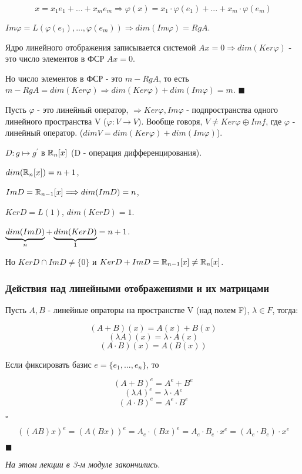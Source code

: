 \documentclass[../main.tex]{subfiles}
\begin{document}
$$x = x_1e_1 + ... + x_m e_m\Longrightarrow \varphi(x) = x_1\cdot\varphi(e_1) + ... + x_m\cdot\varphi(e_m)$$

$Im\varphi = L(\varphi(e_1),...,\varphi(e_m))\Longrightarrow dim(Im\varphi) = RgA$.

Ядро линейного отображения записывается системой $Ax = 0\Longrightarrow dim(Ker\varphi)$ - это число элементов в ФСР
$Ax = 0$.

Но число элементов в ФСР - это $m - RgA$, то есть $m - RgA = dim(Ker\varphi)\Longrightarrow dim(Ker\varphi) + dim(Im\varphi) = m$.
$\blacksquare$

\void{} Пусть $\varphi$ - это линейный оператор, $\Longrightarrow Ker\varphi, Im\varphi$ - подпространства одного
линейного пространства V ($\varphi: V\rightarrow V$). Вообще говоря, $V\neq Ker\varphi\oplus Im f$, где
$\varphi$ - линейный оператор. ($dimV = dim(Ker\varphi) + dim(Im\varphi)$).

\void{} $D: g\mapsto g^{'}$ в $\mathbb{R}_n[x]$ (D - операция дифференцирования).

\void
$dim(\mathbb{R}_n[x]) = n+1$,

$ImD = \mathbb{R}_{n-1}[x]\Longrightarrow dim(ImD) = n$,

$KerD = L(1)$, $dim(KerD) = 1$.

$\underbrace{dim(ImD)}_{n} + \underbrace{dim(KerD)}_{1} = n+1$.

Но $KerD\cap ImD\neq \{0\}$ и $KerD+ImD = \mathbb{R}_{n-1}[x]\neq \mathbb{R}_n[x]$.

\subsubsection{Действия над линейными отображениями и их матрицами}

\void{} Пусть $A, B$ - линейные опраторы на пространстве V (над полем F), $\lambda\in F$, тогда:

$$(A+B)(x) = A(x)+B(x)$$
$$(\lambda A)(x) = \lambda\cdot A(x)$$
$$(A\cdot B)(x) = A(B(x))$$

\void{} Если фиксировать базис $e = \{e_1,...,e_n\}$, то

$$(A+B)^e = A^e + B^e$$
$$(\lambda A)^e = \lambda\cdot A^e$$
$$(A\cdot B)^e = A^e\cdot B^e$$

\void $\square$

$$((AB)x)^e = (A(Bx))^e = A_e\cdot(Bx)^e = A_e\cdot B_e\cdot x^e = (A_e\cdot B_e)\cdot x^e$$

$\blacksquare$

\void\textit{На этом лекции в 3-м модуле закончились.}
\end{document}
